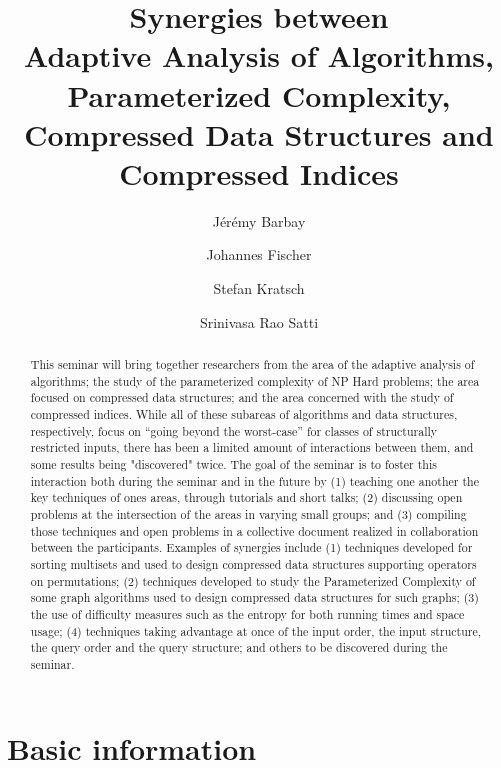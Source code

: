 \documentclass[a4paper,10pt]{article}
\begin{document}
\title{Synergies between \\ Adaptive Analysis of Algorithms, Parameterized Complexity, \\ Compressed Data Structures and Compressed Indices}


\author{J\'er\'emy Barbay \and Johannes Fischer \and Stefan Kratsch \and Srinivasa Rao Satti }
\maketitle              %

\begin{abstract}
This seminar will bring together researchers from the area of the adaptive analysis of algorithms; the study of the parameterized complexity of NP Hard problems; the area focused on compressed data structures; and the area concerned with the study of compressed indices. While all of these subareas of algorithms and data structures, respectively, focus on ``going beyond the worst-case'' for classes of structurally restricted inputs, there has been a limited amount of interactions between them, and some results being "discovered" twice. The goal of the seminar is to foster this interaction both during the seminar and in the future by (1) teaching one another the key techniques of ones areas, through tutorials and short talks; (2) discussing open problems at the intersection of the areas in varying small groups; and (3) compiling those techniques and open problems in a collective document realized in collaboration between the participants.  Examples of synergies include (1) techniques developed for sorting multisets and used to design compressed data structures supporting operators on permutations; (2) techniques developed to study the Parameterized Complexity of some graph algorithms used to design compressed data structures for such graphs; (3) the use of difficulty measures such as the entropy for both running times and space usage; (4) techniques taking advantage at once of the input order, the input structure, the query order and the query structure; and others to be discovered during the seminar.
\end{abstract}


\section{Basic information}
\end{document}
